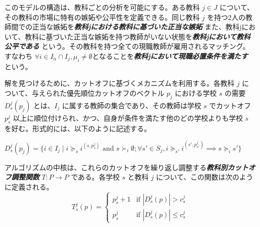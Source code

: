 \documentclass[12pt, a4paper]{article}
\theoremstyle{definition}
\theoremstyle{remark}
\theoremstyle{plain}
\begin{document}







このモデルの構造は、教科ごとの分析を可能にする。ある教科 $j \in J$ について、その教科の市場に特有の嫉妬や公平性を定義できる。同じ教科 $j$ を持つ2人の教師間での正当な嫉妬を\textbf{\textit{教科jにおける教科に基づいた正当な嫉妬}} また、教科jにおいて、教科に基づいた正当な嫉妬を持つ教師がいない状態を\textbf{\textit{教科jにおいて教科公平である}} という。その教科を持つ全ての現職教師が雇用されるマッチング。すなわち $\forall i \in I_\alpha \cap I_j, \mu_i \neq \emptyset$となることを\textbf{\textit{教科jにおいて現職必置条件を満たす}} という。

解を見つけるために、カットオフに基づくメカニズムを利用する。各教科 $j$ について、与えられた優先順位カットオフのベクトル $p_j$ における学校 $s$ の需要 $D^j_s(p_j)$ とは、$I_j$ に属する教師の集合であり、その教師は学校 $s$ でカットオフ $p^j_s$ 以上に順位付けられ、かつ、自身が条件を満たす他のどの学校よりも学校 $s$ を好む。形式的には、以下のように記述する。

$D^j_s(p_j) = \{ i \in I_j \mid i \succeq_s i^{(s,p^j_s)} \text{ and } s \succ_i \emptyset; \forall s' \in S_j, i \succeq_{s'} i^{(s',p^j_{s'})} \implies s \succeq_i s' \}$

アルゴリズムの中核は、これらのカットオフを繰り返し調整する\textbf{\textit{教科別カットオフ調整関数}} $T : P \rightarrow P$ である。各学校 $s$ と教科 $j$ について、この関数は次のように定義される。
\[
T_s^j(p) =
\begin{cases}
p_s^j + 1 & \text{if } | D_s^j(p) | > c^j_s \\
p_s^j     & \text{if } | D_s^j(p) | \leq c^j_s
\end{cases}
\]
\end{document}
